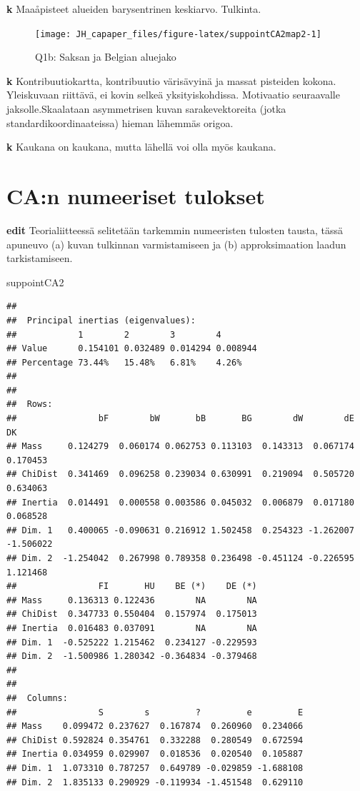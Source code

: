 \documentclass[
  finnish,
]{book}
\newenvironment{Shaded}{\begin{snugshade}}{\end{snugshade}}
\newcommand{\NormalTok}[1]{#1}
\begin{document}
\textbf{k} Maaåpisteet alueiden barysentrinen keskiarvo. Tulkinta.

\begin{figure}

{\centering \texttt{[image: JH\_capaper\_files/figure-latex/suppointCA2map2-1]} 

}

\caption{Q1b: Saksan ja  Belgian aluejako }\label{fig:suppointCA2map2}
\end{figure}

\textbf{k} Kontribuutiokartta, kontribuutio värisävyinä ja massat
pisteiden kokona. Yleiskuvaan riittävä, ei kovin selkeä
yksityiskohdissa. Motivaatio seuraavalle jaksolle.Skaalataan
asymmetrisen kuvan sarakevektoreita (jotka standardikoordinaateissa)
hieman lähemmäs origoa.

\textbf{k} Kaukana on kaukana, mutta lähellä voi olla myös kaukana.

\hypertarget{can-numeeriset-tulokset}{%
\section{CA:n numeeriset tulokset}\label{can-numeeriset-tulokset}}

\textbf{edit} Teorialiitteessä selitetään tarkemmin numeeristen tulosten
tausta, tässä apuneuvo (a) kuvan tulkinnan varmistamiseen ja (b)
approksimaation laadun tarkistamiseen.

\begin{Shaded}
\begin{Highlighting}[]
\NormalTok{suppointCA2}
\end{Highlighting}
\end{Shaded}

\begin{verbatim}
## 
##  Principal inertias (eigenvalues):
##            1        2        3        4       
## Value      0.154101 0.032489 0.014294 0.008944
## Percentage 73.44%   15.48%   6.81%    4.26%   
## 
## 
##  Rows:
##                bF        bW       bB       BG        dW        dE        DK
## Mass     0.124279  0.060174 0.062753 0.113103  0.143313  0.067174  0.170453
## ChiDist  0.341469  0.096258 0.239034 0.630991  0.219094  0.505720  0.634063
## Inertia  0.014491  0.000558 0.003586 0.045032  0.006879  0.017180  0.068528
## Dim. 1   0.400065 -0.090631 0.216912 1.502458  0.254323 -1.262007 -1.506022
## Dim. 2  -1.254042  0.267998 0.789358 0.236498 -0.451124 -0.226595  1.121468
##                FI       HU    BE (*)    DE (*)
## Mass     0.136313 0.122436        NA        NA
## ChiDist  0.347733 0.550404  0.157974  0.175013
## Inertia  0.016483 0.037091        NA        NA
## Dim. 1  -0.525222 1.215462  0.234127 -0.229593
## Dim. 2  -1.500986 1.280342 -0.364834 -0.379468
## 
## 
##  Columns:
##                S        s         ?         e         E
## Mass    0.099472 0.237627  0.167874  0.260960  0.234066
## ChiDist 0.592824 0.354761  0.332288  0.280549  0.672594
## Inertia 0.034959 0.029907  0.018536  0.020540  0.105887
## Dim. 1  1.073310 0.787257  0.649789 -0.029859 -1.688108
## Dim. 2  1.835133 0.290929 -0.119934 -1.451548  0.629110
\end{verbatim}
\end{document}
